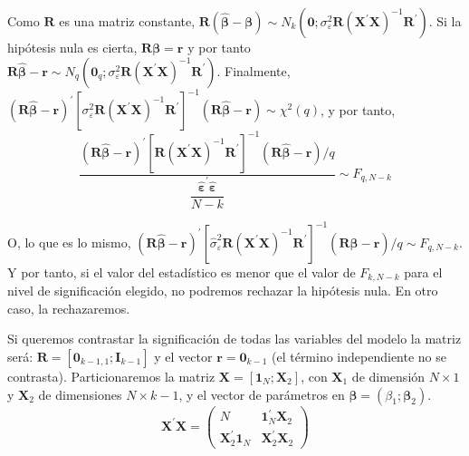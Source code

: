 Como $\boldsymbol{R}$ es una matriz constante, $\boldsymbol{R}\left(\hat{\boldsymbol{\beta}}-\boldsymbol{\beta}\right)\sim N_{k}\left(\boldsymbol{0};\sigma_{\varepsilon}^{2}\boldsymbol{R}\left(\boldsymbol{X}^{\prime}\boldsymbol{X}\right)^{-1}\boldsymbol{R}^{\prime}\right)$.
Si la hip\'otesis nula es cierta, $\boldsymbol{R}\boldsymbol{\beta}=\boldsymbol{r}$
y por tanto $\boldsymbol{R}\hat{\boldsymbol{\beta}}-\boldsymbol{r}\sim N_{q}\left(\boldsymbol{0}_{q};\sigma_{\varepsilon}^{2}\boldsymbol{R}\left(\boldsymbol{X}^{\prime}\boldsymbol{X}\right)^{-1}\boldsymbol{R}^{\prime}\right)$.
Finalmente, $\left(\boldsymbol{R}\hat{\boldsymbol{\beta}}-\boldsymbol{r}\right)^{\prime}\left[\sigma_{\varepsilon}^{2}\boldsymbol{R}\left(\boldsymbol{X}^{\prime}\boldsymbol{X}\right)^{-1}\boldsymbol{R}^{\prime}\right]^{-1}\left(\boldsymbol{R}\hat{\boldsymbol{\beta}}-\boldsymbol{r}\right)\sim\chi^{2}(q)$,
y por tanto,
\begin{equation*}
\dfrac{\left(\boldsymbol{R}\hat{\boldsymbol{\beta}}-\boldsymbol{r}\right)^{\prime}\left[\boldsymbol{R}\left(\boldsymbol{X}^{\prime}\boldsymbol{X}\right)^{-1}\boldsymbol{R}^{\prime}\right]^{-1}\left(\boldsymbol{R}\hat{\boldsymbol{\beta}}-\boldsymbol{r}\right)/q}{\dfrac{\hat{\boldsymbol{\varepsilon}}^{\prime}\hat{\boldsymbol{\varepsilon}}}{N-k}}\sim F_{q,N-k}
\end{equation*}


O, lo que es lo mismo, $\left(\boldsymbol{R}\hat{\boldsymbol{\beta}}-\boldsymbol{r}\right)^{\prime}\left[\hat{\sigma}_{\varepsilon}^{2}\boldsymbol{R}\left(\boldsymbol{X}^{\prime}\boldsymbol{X}\right)^{-1}\boldsymbol{R}^{\prime}\right]^{-1}\left(\boldsymbol{R}\hat{\boldsymbol{\beta}}-\boldsymbol{r}\right)/q\sim F_{q,N-k}$.
Y por tanto, si el valor del estad\'istico es menor que el valor de
$F_{k,N-k}$ para el nivel de significaci\'on elegido, no podremos rechazar
la hip\'otesis nula. En otro caso, la rechazaremos.


Si queremos contrastar la significaci\'on de todas las variables del
modelo la matriz ser\'a: $\boldsymbol{R}=\left[\boldsymbol{0}_{k-1,1};\boldsymbol{I}_{k-1}\right]$
y el vector $\boldsymbol{r}=\boldsymbol{0}_{k-1}$ (el t\'ermino independiente
no se contrasta). Particionaremos la matriz $\boldsymbol{X}=\left[\boldsymbol{1}_{N};\boldsymbol{X}_{2}\right]$,
con $\boldsymbol{X}_{1}$ de dimensi\'on $N\times1$ y $\boldsymbol{X}_{2}$
de dimensiones $N\times k-1$, y el vector de par\'ametros en $\boldsymbol{\beta}=\left(\beta_{1};\boldsymbol{\beta}_{2}\right)$.
\begin{equation*}
\boldsymbol{X}^{\prime}\boldsymbol{X}=\left(\begin{array}{cc}
N & \boldsymbol{1}^{\prime}_{N}\boldsymbol{X}_{2}\\
\boldsymbol{X}^{\prime}_{2}\boldsymbol{1}_{N} & \boldsymbol{X}^{\prime}_{2}\boldsymbol{X}_{2}
\end{array}\right)
\end{equation*}


